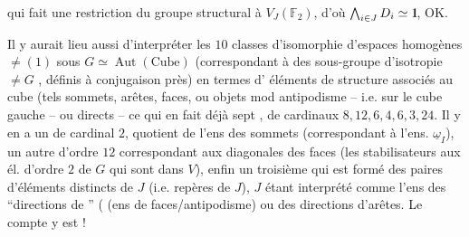 
qui fait une restriction du groupe structural à $V_J(\mathbb F_2)$, d'où $\bigwedge_{i\in J}D_i\simeq\mathord{1\mkern-4mu\rule{.055em}{.66em}}$, OK.

Il y aurait lieu aussi d'interpréter les $10$ classes d'isomorphie d'espaces homogènes $\ne(1)$ sous $G\simeq\operatorname{Aut}(\text{Cube})$ (correspondant à des  sous-groupe d'isotropie $\ne G$ \unsure{\}|)}, définis à conjugaison près) en termes d' éléments de structure associés au cube (tels sommets, arêtes, faces, ou  objets mod antipodisme -- i.e. sur le cube gauche -- ou   directs -- ce qui en fait déjà sept , de cardinaux $8,12,6,4,6,3,24$. Il y en a un de cardinal $2$, quotient de l'ens des sommets (correspondant à l'ens. $\underline\omega_I$), un autre d'ordre $12$ correspondant aux  diagonales des faces  (les stabilisateurs   aux él. d'ordre $2$ de $G$ qui  sont  dans $V$), enfin un troisième qui est formé des paires d'éléments distincts de $J$ (i.e. repères de $J$), $J$ étant interprété comme l'ens des ``directions de  '' ( (ens de faces/antipodisme) ou des directions d'arêtes. Le compte y est !




